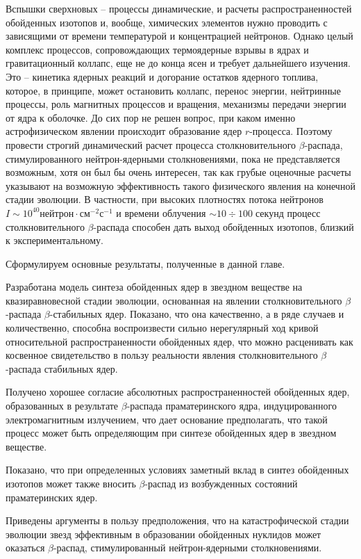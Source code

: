 Вспышки сверхновых -- процессы динамические, и расчеты распространенностей
обойденных изотопов и, вообще, химических элементов нужно проводить
с зависящими от времени температурой
и концентрацией нейтронов. Однако целый комплекс процессов, сопровождающих
термоядерные взрывы в ядрах и гравитационный коллапс, еще не до конца ясен и
требует дальнейшего изучения. Это -- кинетика ядерных реакций и догорание остатков
ядерного топлива, которое, в принципе, может остановить коллапс, перенос энергии,
нейтринные процессы, роль магнитных процессов и вращения, механизмы передачи энергии
от ядра к оболочке. До сих пор не решен вопрос, при каком именно астрофизическом
явлении происходит образование ядер $r$-процесса.
Поэтому провести строгий динамический расчет процесса столкновительного
$\beta$-распада,
стимулированного нейтрон-ядерными столкновениями, пока не представляется
возможным, хотя он был бы очень интересен, так как грубые оценочные расчеты
указывают на возможную эффективность такого физического явления на конечной стадии
эволюции. В частности, при высоких плотностях потока нейтронов $I\sim 10^{40}
нейтрон\cdot см^{-2}с^{-1}$ и времени облучения $\sim 10\div 100 \; секунд$
процесс столкновительного $\beta$-распада способен дать выход обойденных
изотопов, близкий к экспериментальному.


Сформулируем основные результаты, полученные в данной главе.


Разработана модель синтеза обойденных ядер в звездном веществе на
квазиравновесной стадии эволюции, основанная на явлении столкновительного
$\beta$-распада $\beta$-стабильных ядер.
Показано, что она качественно, а в ряде случаев и количественно, способна
воспроизвести сильно нерегулярный ход кривой относительной распространенности
обойденных ядер, что можно расценивать как косвенное свидетельство в пользу
реальности явления столкновительного $\beta$-распада стабильных ядер.


Получено хорошее согласие абсолютных распространенностей обойденных ядер,
образованных в результате  $\beta$-распада праматеринского  ядра,
индуцированного электромагнитным излучением, что дает основание предполагать,
что такой процесс может быть определяющим при синтезе обойденных ядер в
звездном веществе.


Показано, что при определенных условиях  заметный вклад в синтез
обойденных изотопов может также вносить $\beta$-распад из возбужденных
состояний праматеринских ядер.


Приведены аргументы в пользу предположения, что на катастрофической стадии эволюции звезд
эффективным
в образовании обойденных нуклидов может оказаться
$\beta$-распад, стимулированный нейтрон-ядерными столкновениями.

